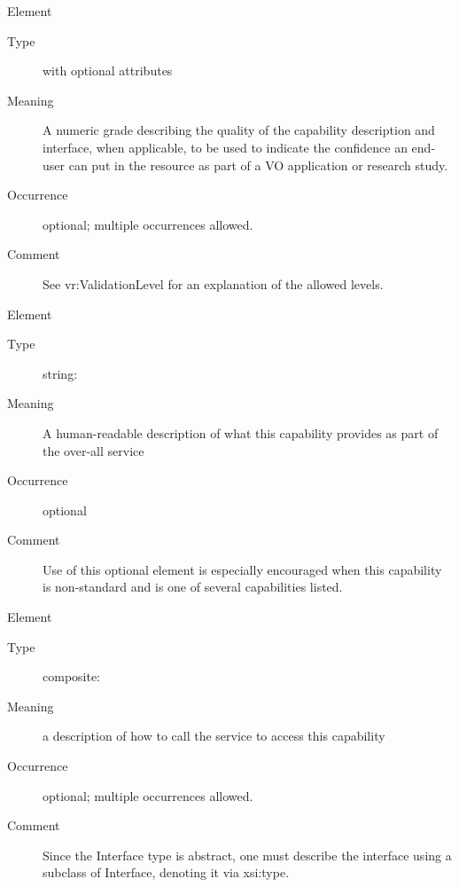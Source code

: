 \documentclass[11pt,a4paper]{ivoa}
\begin{document}
\begingroup\small\begin{bigdescription}\item[Element \xmlel{validationLevel}]
\begin{description}
\item[Type]  with optional attributes
\item[Meaning] 
                  A numeric grade describing the quality of the
                  capability description and interface, when applicable, 
                  to be used to indicate the confidence an end-user
                  can put in the resource as part of a VO application
                  or research study. 
               
\item[Occurrence] optional; multiple occurrences allowed.
\item[Comment] 
                  See vr:ValidationLevel for an explanation of the
                  allowed levels.  
               

\end{description}
\item[Element \xmlel{description}]
\begin{description}
\item[Type] string: 
\item[Meaning] 
                  A human-readable description of what this capability 
                  provides as part of the over-all service 
               
\item[Occurrence] optional
\item[Comment] 
                  Use of this optional element is especially encouraged when
                  this capability is non-standard and is one of several 
                  capabilities listed.
               

\end{description}
\item[Element \xmlel{interface}]
\begin{description}
\item[Type] composite: 
\item[Meaning] 
                  a description of how to call the service to access
                  this capability
               
\item[Occurrence] optional; multiple occurrences allowed.
\item[Comment] 
                  Since the Interface type is abstract, one must describe
                  the interface using a subclass of Interface, denoting
                  it via xsi:type.
               

\end{description}
\end{bigdescription}
\end{document}
